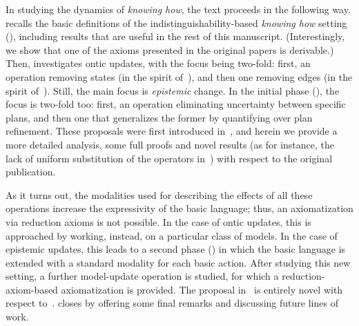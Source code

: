 In studying the dynamics of \emph{knowing how}, the text proceeds in the following way.  recalls the basic definitions of the indistinguishability-based \emph{knowing how} setting (\cite{AFSVQ21,AFSVQ23report}), including results that are useful in the rest of this manuscript. (Interestingly, we show that one of the axioms presented in the original papers is derivable.) Then,  investigates ontic updates, with the focus being two-fold: first, an operation removing states (in the spirit of~\cite{Plaza89:lopc}), and then one removing edges (in the spirit of~\cite{KooiR11}). Still, the main focus is \emph{epistemic} change. In the initial phase (), the focus is two-fold too: first, an operation eliminating uncertainty between specific plans, and then one that generalizes the former by quantifying over plan refinement. 
These proposals were first introduced in~\cite{AFSV22}, and herein we provide a more detailed analysis, some full proofs and novel results (as for instance, the lack of uniform substitution of the operators in~) with respect to the original publication.

As it turns out, the modalities used for describing the effects of all these operations increase the expressivity of the basic language; thus, an axiomatization via reduction axioms is not possible. In the case of ontic updates, this is approached by working, instead, on a particular class of models. In the case of epistemic updates, this leads to a second phase () in which the basic language is extended with a standard modality for each basic action. After studying this new setting, a further model-update operation is studied, for which a reduction-axiom-based axiomatization is provided. 
The proposal in~ is entirely novel with respect to~\cite{AFSV22}. 
 closes by offering some final remarks and discussing future lines of work.
